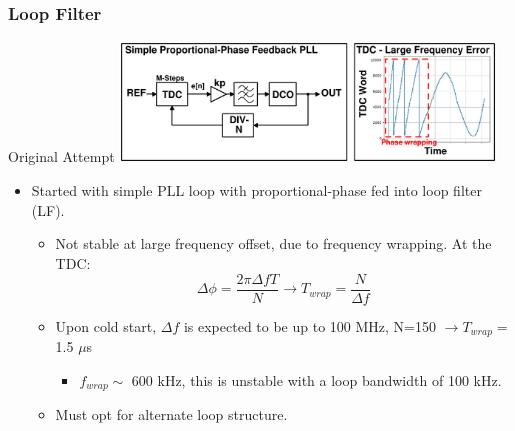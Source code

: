 \documentclass[t, screen, aspectratio=43]{beamer}
\begin{document}
\begin{frame}
	\frametitle{Loop Filter}
	\begin{block}{Original Attempt}
		\vspace{-.2em}
		\vspace{-0.5em}
		\center\includegraphics[width=0.75\textwidth, angle=0]{phase_wrap.pdf}
		\vspace{-0.5em}
		\begin{itemize}
			\footnotesize
			\item Started with simple PLL loop with proportional-phase fed into loop filter (LF).
			\begin{itemize}
				\scriptsize
				\item Not stable at large frequency offset, due to frequency wrapping. At the TDC:
				\tiny
				\begin{equation}
					\Delta \phi = \frac{2\pi \Delta f T}{N} \rightarrow T_{wrap} = \frac{N}{\Delta f}
				\end{equation}
				\scriptsize
				\item Upon cold start, $\Delta f$ is expected to be up to 100 MHz, N=150 $\rightarrow T_{wrap} = $ 1.5 $\mu$s
				\begin{itemize} 
					\scriptsize
					\item $f_{wrap} \sim$  600 kHz, this is unstable with a loop bandwidth of 100 kHz.
				\end{itemize}
				\item Must opt for alternate loop structure.
			\end{itemize}
		\end{itemize} 	
	\end{block}
\end{frame}
\end{document}
